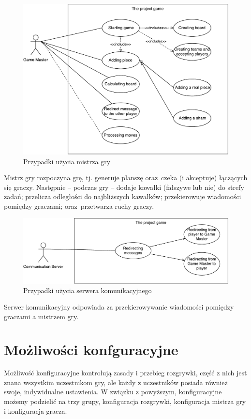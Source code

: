 \documentclass[a4paper]{article}
\begin{document}
\begin{figure}[H]
\caption{Przypadki użycia mistrza gry}
\centering
\includegraphics[scale=0.7]{przypadki_uzycia_gm.pdf}
\end{figure}

Mistrz gry rozpoczyna grę, tj. generuje planszę oraz~czeka (i akceptuje) łączących się graczy.
Następnie -- podczas gry -- dodaje kawałki (fałszywe lub nie) do strefy zadań; przelicza odległości do najbliższych kawałków; przekierowuje wiadomości pomiędzy graczami; oraz~przetwarza ruchy graczy.

\begin{figure}[H]
\caption{Przypadki użycia serwera komunikacyjnego}
\centering
\includegraphics[scale=0.7]{przypadki_uzycia_cs.pdf}
\end{figure}

Serwer komunikacyjny odpowiada za przekierowywanie wiadomości pomiędzy graczami a mistrzem gry.

\section{Możliwości konfguracyjne}
Możliwość konfiguracyjne kontrolują zasady i przebieg rozgrywki, część z nich jest znana wszystkim uczestnikom gry, ale każdy z uczestników posiada również swoje, indywidualne ustawienia. W związku z powyższym,  konfiguracyjne możemy podzielić na trzy grupy, konfiguracja rozgrywki, konfiguracja mistrza gry i konfiguracja gracza.
\end{document}
